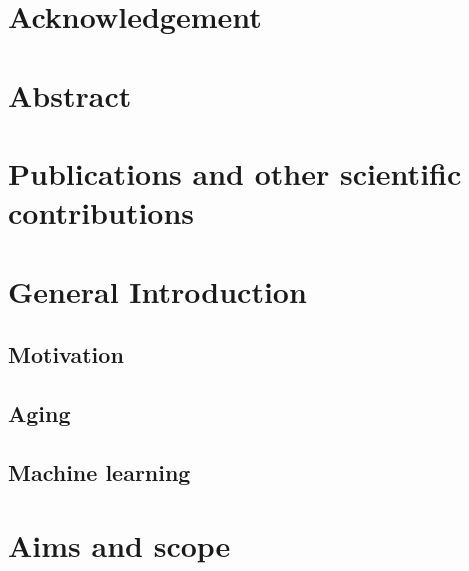 \documentclass{book}
\begin{document}

\tableofcontents
\chapter*{Acknowledgement}



\chapter*{Abstract}
\setcounter{page}{2}



\listoffigures
{}


\listoftables
{}

\printglossary[title={List of Abbreviations}]

\chapter*{Publications and other scientific contributions}


\chapter{General Introduction}\label{chap:intro}

    \section{Motivation}
    
    \label{motivation}

    \section{Aging}
    \label{theory:aging}
        
    
    \section{Machine learning}
    \label{theory:ml}
     
    
\chapter{Aims and scope}
\label{chap:aims_scope}

\end{document}
